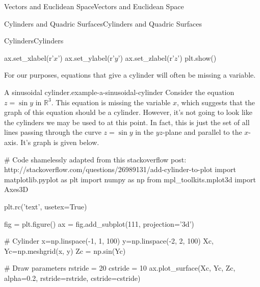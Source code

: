 \documentclass[10pt,]{book}
\numberwithin{equation}{section}
\newcommand{\RR}{\mathbb{R}}
\begin{document}
\begin{chapterptx}{Vectors and Euclidean Space}{}{Vectors and Euclidean Space}{}{}
\begin{sectionptx}{Cylinders and Quadric Surfaces}{}{Cylinders and Quadric Surfaces}{}{}
\begin{subsectionptx}{Cylinders}{}{Cylinders}{}{}
\begin{sageinput}
ax.set_xlabel(r'$x$')
ax.set_ylabel(r'$y$')
ax.set_zlabel(r'$z$')
plt.show()
\end{sageinput}
\hypertarget{p-1020}{}%
For our purposes, equations that give a cylinder will often be missing a variable.%
\begin{example}{A sinusoidal cylinder.}{example-a-sinusoidal-cylinder}%
\hypertarget{p-1021}{}%
Consider the equation \(z = \sin y\) in \(\RR^{3}\). This equation is missing the variable \(x\), which suggests that the graph of this equation should be a cylinder. However, it's not going to look like the cylinders we may be used to at this point. In fact, this is just the set of all lines passing through the curve \(z=\sin y\) in the \(yz\)-plane and parallel to the \(x\)-axis. It's graph is given below.%
\end{example}
\begin{sageinput}
# Code shamelessly adapted from this stackoverflow post: http://stackoverflow.com/questions/26989131/add-cylinder-to-plot
import matplotlib.pyplot as plt
import numpy as np
from mpl_toolkits.mplot3d import Axes3D

plt.rc('text', usetex=True)

fig = plt.figure()
ax = fig.add_subplot(111, projection='3d')

# Cylinder
x=np.linspace(-1, 1, 100)
y=np.linspace(-2, 2, 100)
Xc, Yc=np.meshgrid(x, y)
Zc = np.sin(Yc)

# Draw parameters
rstride = 20
cstride = 10
ax.plot_surface(Xc, Yc, Zc, alpha=0.2, rstride=rstride, cstride=cstride)


\end{sageinput}
\end{subsectionptx}
\end{sectionptx}
\end{chapterptx}
\end{document}
